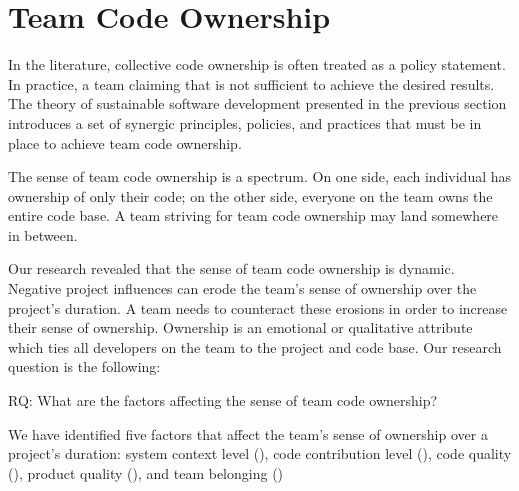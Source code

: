 
\section{Team Code Ownership}
\label{TeamCodeOwnership}

In the literature, collective code ownership is often treated as a policy statement. In practice, a team claiming that  is not sufficient to achieve the desired results. The theory of sustainable software development presented in the previous section introduces a set of synergic principles, policies, and practices that must be in place to achieve team code ownership. 

The sense of team code ownership is a spectrum. On one side, each individual has ownership of only their code;  on the other side, everyone on the team owns the entire code base. A team striving for team code ownership may land somewhere in between. 

Our research revealed that the sense of team code ownership is dynamic. Negative project influences can erode the team's sense of ownership over the project’s duration. A team needs to counteract these erosions in order to increase their sense of ownership. Ownership is an emotional or qualitative attribute which ties all developers on the team to the project and code base. Our research question is the following:

RQ: What are the factors affecting the sense of team code ownership?

We have identified five factors that affect the team’s sense of ownership over a project’s duration: system context level (), code contribution level (), code quality (), product quality (), and team belonging ()

